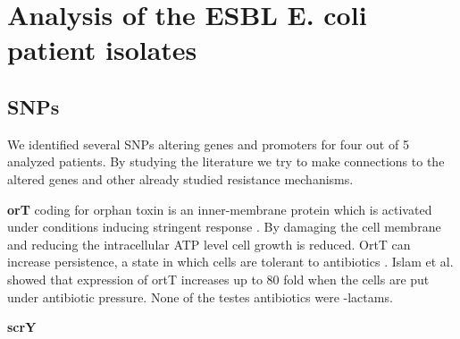 \section{Analysis of the ESBL E. coli patient isolates}

\subsection{SNPs}

We identified several SNPs 	altering genes and promoters for four out of 5 analyzed patients. By studying the literature we try to make connections to the altered genes and other already studied resistance mechanisms. 

\textbf{orT} coding for orphan toxin is an inner-membrane protein which is activated under conditions inducing stringent response \cite{islam_orphan_2015}. By damaging the cell membrane and reducing the intracellular ATP level cell growth is reduced. OrtT can increase persistence, a state in which cells are tolerant to antibiotics \cite{islam_orphan_2015}. Islam et al. showed that expression of ortT increases up to 80 fold when the cells are put under antibiotic pressure. None of the testes antibiotics were \textbeta-lactams. 

\textbf{scrY}